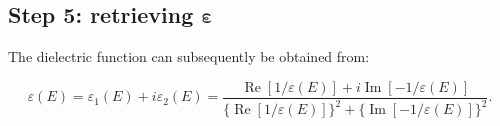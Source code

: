 \documentclass{article}
\begin{document}
\subsection{Step 5: retrieving $\boldsymbol\varepsilon$}
The dielectric function  can subsequently be obtained from:

\begin{equation}
    \varepsilon(E)=\varepsilon_{1}(E)+i \varepsilon_{2}(E)=\frac{\operatorname{Re}[1 / \varepsilon(E)]+i \operatorname{Im}[-1 / \varepsilon(E)]}{\{\operatorname{Re}[1 / \varepsilon(E)]\}^{2}+\{\operatorname{Im}[-1 / \varepsilon(E)]\}^{2}}.
\end{equation}


\vspace{2cm}



\end{document}
